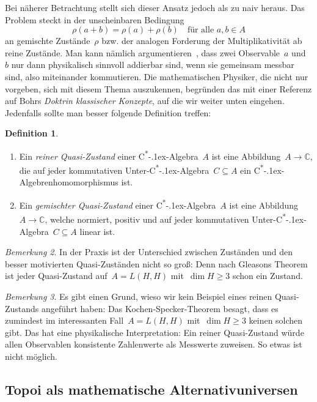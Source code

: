 \documentclass[a4paper,ngerman,12pt]{scrartcl}
\theoremstyle{definition}
\newtheorem{defn}{Definition}[section]
\theoremstyle{plain}
\theoremstyle{remark}
\newtheorem{bem}[defn]{Bemerkung}
\newcommand{\CC}{\mathbb{C}}
\newcommand{\csalgebra}{C\textsuperscript{*}\kern-.1ex-Algebra}
\newcommand{\csalgebren}{C\textsuperscript{*}\kern-.1ex-Alge\-bren}
\renewcommand{\_}{\mathpunct{.}\,}
\newcommand{\?}{\,{:}\,}
\begin{document}
Bei näherer Betrachtung stellt sich dieser Ansatz jedoch als zu naiv heraus. Das
Problem steckt in der unscheinbaren Bedingung
\[ \rho(a + b) = \rho(a) + \rho(b) \quad\text{für alle~$a,b \in A$} \]
an gemischte Zustände~$\rho$ bzw. der analogen Forderung der
Multiplikativität ab reine Zustände. Man kann nämlich
argumentieren~\cite[Seite~27]{topos:aqt},
dass zwei Observable~$a$ und~$b$ nur dann physikalisch sinnvoll addierbar sind,
wenn sie gemeinsam messbar sind, also miteinander kommutieren. Die
mathematischen Physiker, die nicht nur vorgeben, sich mit diesem Thema
auszukennen, begründen das mit einer Referenz auf Bohrs \emph{Doktrin
klassischer Konzepte}, auf die wir weiter unten eingehen. Jedenfalls sollte man
besser folgende Definition treffen:

\begin{defn}\begin{enumerate}
\item
Ein \emph{reiner Quasi-Zustand} einer \csalgebra~$A$ ist eine Abbildung~$A \to \CC$,
die auf jeder kommutativen Unter-\csalgebra~$C \subseteq A$ ein
\csalgebren\-homo\-mor\-phis\-mus ist.
\item Ein \emph{gemischter Quasi-Zustand} einer \csalgebra~$A$ ist eine Abbildung~$A
\to \CC$, welche normiert, positiv und auf jeder kommutativen
Unter-\csalgebra~$C \subseteq A$ linear ist.
\end{enumerate}
\end{defn}

\begin{bem}In der Praxis ist der Unterschied zwischen Zuständen und den besser
motivierten Quasi-Zuständen nicht so groß: Denn nach Gleasons Theorem ist jeder
Quasi-Zustand auf~$A = L(H,H)$ mit~$\dim H \geq 3$ schon ein Zustand.\end{bem}

\begin{bem}\label{bem:keine-reinen-quasi-zustaende}%
Es gibt einen Grund, wieso wir kein Beispiel eines reinen Quasi-Zustands
angeführt haben: Das Kochen-Specker-Theorem besagt, dass es zumindest im
interessanten Fall~$A = L(H,H)$ mit~$\dim H \geq 3$ keinen solchen gibt. Das
hat eine physikalische Interpretation: Ein reiner Quasi-Zustand würde allen
Observablen konsistente Zahlenwerte als Messwerte zuweisen. So etwas ist nicht
möglich.\end{bem}


\subsection{Topoi als mathematische Alternativuniversen}
\end{document}
